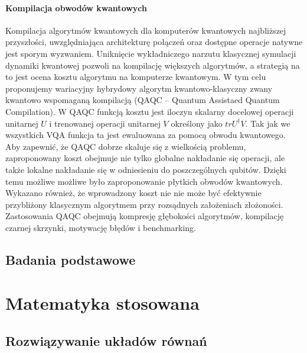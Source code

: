 \documentclass[a4paper,11pt]{article}
\begin{document}
\paragraph{Kompilacja obwodów kwantowych} Kompilacja algorytmów kwantowych dla komputerów kwantowych najbliższej przyszłości, uwzględniająca architekturę połączeń oraz dostępne operacje natywne jest sporym wyzwaniem. Uniknięcie wykładniczego narzutu klasycznej symulacji dynamiki kwantowej pozwoli na kompilację większych algorytmów, a strategią na to jest ocena kosztu algorytmu na komputerze kwantowym. W tym celu proponujemy wariacyjny hybrydowy algorytm kwantowo-klasyczny zwany kwantowo wspomaganą kompilacją (QAQC -- Quantum Assistaed Quantum Compilation). 
%
W QAQC funkcją kosztu jest iloczyn skalarny docelowej operacji unitarnej $U$ i trenowanej operacji unitarnej $V$ określony jako $tr U^\dagger V$. Tak jak we wszystkich VQA funkcja ta jest ewaluowana za pomocą obwodu kwantowego.
%
Aby zapewnić, że QAQC dobrze skaluje się z wielkością problemu, zaproponowany koszt obejmuje nie tylko globalne nakładanie się operacji, ale także lokalne nakładanie się w odniesieniu do poszczególnych qubitów. Dzięki temu możliwe możliwe było zaproponowanie płytkich obwodów kwantowych. Wykazano również, że wprowadzony koszt nie nie może być efektywnie przybliżony klasycznym algorytmem przy rozsądnych założeniach złożoności.
% 
Zastosowania QAQC obejmują kompresję głębokości algorytmów, kompilację czarnej skrzynki, motywację błędów i benchmarking.

\subsection{Badania podstawowe}
\newpage 

\section{Matematyka stosowana}

\subsection{Rozwiązywanie układów równań}
\end{document}
